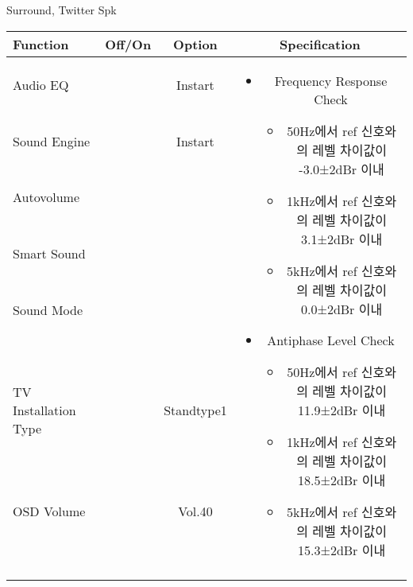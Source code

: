 \begin{frame}[t]{Surround, Twitter Spk}
\begin{tiny}
\begin{tabular}{@{}lccc@{}}
\toprule
Function & Off/On & Option & Specification \\
\midrule
Audio EQ & \color{black}{Off} & Instart &
\multirow{10}{60mm}{
\begin{itemize}
	\vspace{-3mm}
	\item Frequency Response Check
	\begin{itemize}
		\item 50Hz에서 ref 신호와의 레벨 차이값이 -3.0±2dBr 이내
		\item 1kHz에서 ref 신호와의 레벨 차이값이 3.1±2dBr 이내
		\item 5kHz에서 ref 신호와의 레벨 차이값이 0.0±2dBr 이내
	\end{itemize}
	\item Antiphase Level Check
	\begin{itemize}
		\item 50Hz에서 ref 신호와의 레벨 차이값이 11.9±2dBr 이내
		\item 1kHz에서 ref 신호와의 레벨 차이값이 18.5±2dBr 이내
		\item 5kHz에서 ref 신호와의 레벨 차이값이 15.3±2dBr 이내
	\end{itemize}
\end{itemize}
} \\
Sound Engine & \color{blue}{On} & Instart & \\
Autovolume & \color{black}{Off} & & \\
Smart Sound & \color{black}{Off} & & \\
Sound Mode & \color{blue}{On} & \color{blue}{Surround} & \\
TV Installation Type & \color{blue}{On} & Standtype1 & \\
OSD Volume & \color{blue}{On} & Vol.40 & \\
& & & \\
& & & \\
& & & \\
& & & \\
\midrule
\end{tabular}
\end{tiny}


\end{frame}
